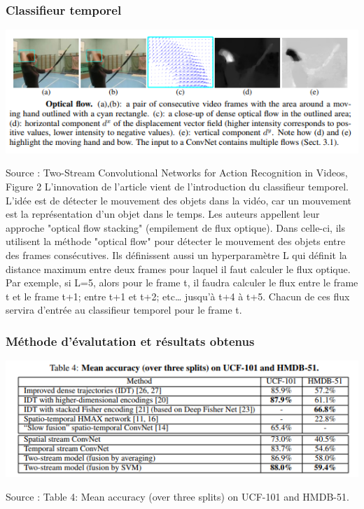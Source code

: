\documentclass[11pt]{article}
\begin{document}
\subsubsection{Classifieur temporel}
\label{sec:orgb5c3e45}
\begin{center}
\includegraphics[width=.9\linewidth]{optical_flow.png}
\end{center}
Source : Two-Stream Convolutional Networks for Action Recognition in Videos, Figure 2
L'innovation de l'article vient de l'introduction du classifieur temporel.
L'idée est de détecter le mouvement des objets dans la vidéo, car un mouvement est la représentation d'un objet dans le temps.
Les auteurs appellent leur approche "optical flow stacking" (empilement de flux optique).
Dans celle-ci, ils utilisent la méthode "optical flow" pour détecter le mouvement des objets entre des frames consécutives.
Ils définissent aussi un hyperparamètre L qui définit la distance maximum entre deux frames pour laquel il faut calculer le flux optique.
Par exemple, si L=5, alors pour le frame t, il faudra calculer le flux entre le frame t et le frame t+1; entre t+1 et t+2; etc\ldots{} jusqu'à t+4 à t+5.
Chacun de ces flux servira d'entrée au classifieur temporel pour le frame t.

\subsubsection{Méthode d'évalutation et résultats obtenus}
\label{sec:org6b8f7b5}
\begin{center}
\includegraphics[width=.9\linewidth]{two_stream_res.png}
\end{center}
Source : Table 4: Mean accuracy (over three splits) on UCF-101 and HMDB-51.
\end{document}
